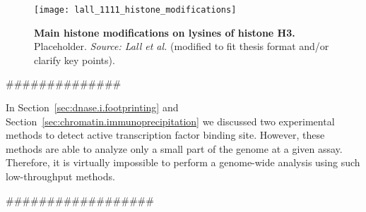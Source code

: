 \begin{figure}[h!]
\centering
\texttt{[image: lall\_1111\_histone\_modifications]}
\caption[Main histone modifications on lysines of histone H3]{\textbf{Main histone modifications on lysines of histone H3.} Placeholder. \emph{Source: Lall et al.}\cite{lall2007} (modified to fit thesis format and/or clarify key points).}
\label{fig:lall_histone_modifications}
\end{figure}





##############


In Section~\ref{sec:dnase.i.footprinting} and Section~\ref{sec:chromatin.immunoprecipitation} we discussed two experimental methods to detect active transcription factor binding site. However, these methods are able to analyze only a small part of the genome at a given assay. Therefore, it is virtually impossible to perform a genome-wide analysis using such low-throughput methods.




##################





